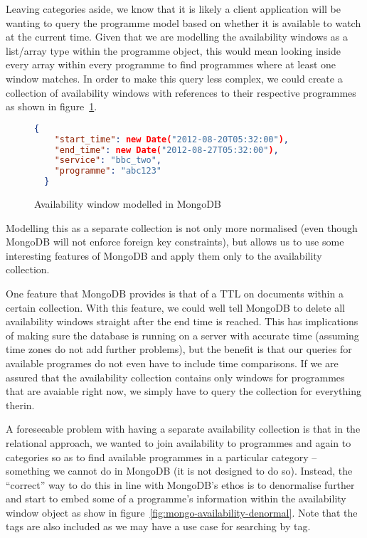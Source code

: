 \documentclass[11pt,a4paper]{article}
\begin{document}
Leaving categories aside, we know that it is likely a client
application will be wanting to query the programme model based
on whether it is available to watch at the current time. Given
that we are modelling the availability windows as a list/array
type within the programme object, this would mean looking inside
every array within every programme to find programmes where
at least one window matches. In order to make this query
less complex, we could create a collection of availability
windows with references to their respective programmes as shown
in figure~\ref{fig:mongo-availability-window}.

\begin{figure}[p]
\begin{lstlisting}[language=json]
  {
    "start_time": new Date("2012-08-20T05:32:00"),
    "end_time": new Date("2012-08-27T05:32:00"),
    "service": "bbc_two",
    "programme": "abc123"
  }
\end{lstlisting}
  \caption{Availability window modelled in MongoDB}
  \label{fig:mongo-availability-window}
\end{figure}

Modelling this as a separate collection is not only more
normalised (even though MongoDB will not enforce foreign key
constraints), but allows us to use some interesting features
of MongoDB and apply them only to the availability collection.

One feature that MongoDB provides is that of a TTL on documents
within a certain collection. \cite{mongo-expiry} With this
feature, we could well tell MongoDB to delete all availability
windows straight after the end time is reached. This has implications
of making sure the database is running on a server with accurate
time (assuming time zones do not add further problems), but the
benefit is that our queries for available programes do not even
have to include time comparisons. If we are assured that the
availability collection contains only windows for programmes
that are avaiable right now, we simply have to query the collection
for everything therin.

A foreseeable problem with having a separate availability
collection is that in the relational approach, we wanted to join
availability to programmes and again to categories so as to find
available programmes in a particular category -- something we
cannot do in MongoDB (it is not designed to do so). Instead,
the ``correct'' way to do this in line with MongoDB's ethos
is to denormalise further and start to embed some of a
programme's information within the availability window
object as show in figure~\ref{fig:mongo-availability-denormal}.
Note that the tags are also included as we may have a use
case for searching by tag.
\end{document}
